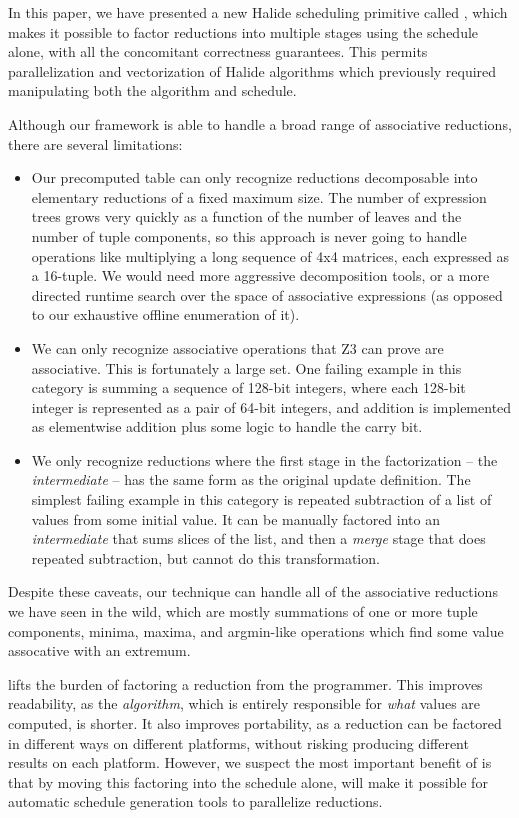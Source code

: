 In this paper, we have presented a new Halide scheduling primitive called , which makes it possible to factor reductions into multiple stages using the schedule alone, with all the concomitant correctness guarantees. This permits parallelization and vectorization of Halide algorithms which previously required manipulating both the algorithm and schedule.

Although our framework is able to handle a broad range of associative reductions, there are several limitations:

\begin{itemize}
\item Our precomputed table can only recognize reductions decomposable into elementary reductions of a fixed maximum size. The number of expression trees grows very quickly as a function of the number of leaves and the number of tuple components, so this approach is never going to handle operations like multiplying a long sequence of 4x4 matrices, each expressed as a 16-tuple. We would need more aggressive decomposition tools, or a more directed runtime search over the space of associative expressions (as opposed to our exhaustive offline enumeration of it).
\item We can only recognize associative operations that Z3 can prove are associative. This is fortunately a large set. One failing example in this category is summing a sequence of 128-bit integers, where each 128-bit integer is represented as a pair of 64-bit integers, and addition is implemented as elementwise addition plus some logic to handle the carry bit.
\item We only recognize reductions where the first stage in the factorization -- the \emph{intermediate} -- has the same form as the original update definition. The simplest failing example in this category is repeated subtraction of a list of values from some initial value. It can be manually factored into an \emph{intermediate} that sums slices of the list, and then a \emph{merge} stage that does repeated subtraction, but  cannot do this transformation.
\end{itemize}

Despite these caveats, our technique can handle all of the associative reductions we have seen in the wild, which are mostly summations of one or more tuple components, minima, maxima, and argmin-like operations which find some value assocative with an extremum.

 lifts the burden of factoring a reduction from the programmer. This improves readability, as the \emph{algorithm}, which is entirely responsible for \emph{what} values are computed, is shorter. It also improves portability, as a reduction can be factored in different ways on different platforms, without risking producing different results on each platform. However, we suspect the most important benefit of  is that by moving this factoring into the schedule alone,  will make it possible for automatic schedule generation tools to parallelize reductions.
